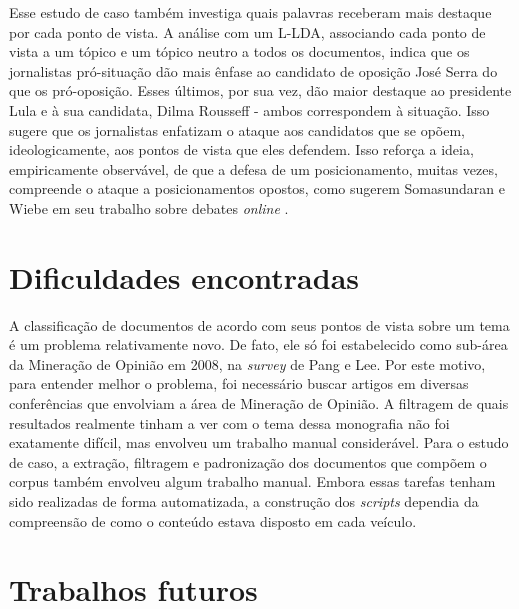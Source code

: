 Esse estudo de caso também investiga quais palavras receberam mais destaque por cada ponto de vista. A análise com um L-LDA, associando cada ponto de vista a um tópico e um tópico neutro a todos os documentos, indica que os jornalistas pró-situação dão mais ênfase ao candidato de oposição José Serra do que os pró-oposição. Esses últimos, por sua vez, dão maior destaque ao presidente Lula e à sua candidata, Dilma Rousseff - ambos correspondem à situação. Isso sugere que os jornalistas enfatizam o ataque aos candidatos que se opõem, ideologicamente, aos pontos de vista que eles defendem. Isso reforça a ideia, empiricamente observável, de que a defesa de um posicionamento, muitas vezes, compreende o ataque a posicionamentos opostos, como sugerem Somasundaran e Wiebe em seu trabalho sobre debates \emph{online} \cite{wiebe}.  

\section{Dificuldades encontradas}

A classificação de documentos de acordo com seus pontos de vista sobre um tema é um problema relativamente novo. De fato, ele só foi estabelecido como sub-área da Mineração de Opinião em 2008, na \emph{survey} de Pang e Lee. Por este motivo, para entender melhor o problema, foi necessário buscar artigos em diversas conferências que envolviam a área de Mineração de Opinião. A filtragem de quais resultados realmente tinham a ver com o tema dessa monografia não foi exatamente difícil, mas envolveu um trabalho manual considerável. Para o estudo de caso, a extração, filtragem e padronização dos documentos que compõem o corpus também envolveu algum trabalho manual. Embora essas tarefas tenham sido realizadas de forma automatizada, a construção dos \emph{scripts} dependia da compreensão de como o conteúdo estava disposto em cada veículo.  

\section{Trabalhos futuros}

